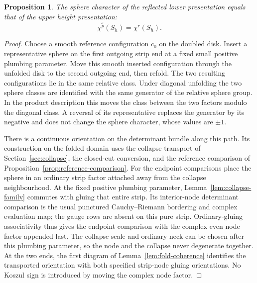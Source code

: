 \documentclass[11pt]{amsart}
\newtheorem{proposition}[theorem]{Proposition}
\theoremstyle{definition}
\theoremstyle{remark}
\theoremstyle{plain}
\numberwithin{equation}{section}
\begin{document}
\begin{proposition}\label{prop:fold-character}
The sphere character of the reflected lower presentation equals that
of the upper height presentation:
\[
 \chi^{\bar{\widetilde p}}(S_h)=\chi^r(S_h).
\]
\end{proposition}
\begin{proof}
Choose a smooth reference configuration
$c_0$ on the doubled disk. Insert a representative sphere on
the first outgoing strip end at a fixed small positive plumbing
parameter. Move this smooth inserted configuration through the
unfolded disk to the second outgoing end, then refold. The two
resulting configurations lie in the same relative class. Under diagonal
unfolding the two sphere
classes are identified with the same generator of the relative
sphere group. In the product description this moves the class
between the two factors modulo the diagonal class. A reversal of
its representative replaces the generator by its negative and
does not change the sphere character, whose values are $\pm1$.

There is a continuous orientation on
the determinant bundle along this path.
Its construction on the folded domain
uses the collapse transport of
Section~\ref{sec:collapse}, the
closed-cut conversion, and the
reference comparison of
Proposition~\ref{prop:reference-comparison}. For the endpoint comparisons place
the sphere in an ordinary strip factor attached away from the
collapse neighbourhood. At the fixed positive plumbing parameter,
Lemma~\ref{lem:collapse-family} commutes with gluing that entire
strip. Its interior-node determinant comparison is the usual
punctured Cauchy--Riemann bordering and complex evaluation map;
the gauge rows are absent on this pure strip. Ordinary-gluing
associativity thus gives the endpoint comparison with the complex
even node factor appended last. The collapse scale and ordinary
neck can be chosen after this plumbing parameter, so the node and the
collapse never degenerate together. At the two ends,
the first diagram of Lemma~\ref{lem:fold-coherence}
identifies the transported orientation with both specified
strip-node gluing orientations.
No Koszul sign is introduced by moving
the complex node factor.


\end{proof}
\end{document}
